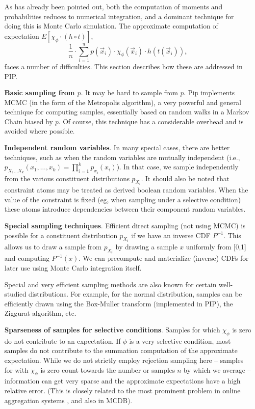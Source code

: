 

As has already been pointed out,
both the computation of moments and probabilities reduces to numerical
integration, and a dominant technique for doing this is Monte Carlo simulation.
The approximate computation of expectation
$E[\chi_\phi \cdot (h \circ t)]$,
\begin{equation}
\frac{1}{n} \cdot \sum_{i=1}^n p(\vec{x}_i) \cdot \chi_\phi(\vec{x}_i) \cdot
h(t(\vec{x}_i)),
\end{equation}
faces a number of difficulties.
This section describes how these are addressed in PIP.

{\bf Basic sampling from $p$}.
It may be hard to sample from $p$.
Pip implements MCMC (in the form of the Metropolis algorithm),
a very powerful and general technique for computing samples, essentially based
on random walks in a Markov Chain biased by $p$. Of course, this technique
has a considerable overhead and is avoided where possible.

{\bf Independent random variables}.
In many special cases, there are better techniques, such as
when the random variables are mutually independent (i.e.,
$p_{X_1 \dots X_k}(x_1, \dots, x_k) = \prod_{i=1}^k p_{x_i}(x_i)$).
In that case, we sample independently from the various constituent
distributions $p_{X_i}$.  It should also be noted that constraint atoms may 
be treated as derived boolean random variables.  When the value of the constraint is
fixed (eg, when sampling under a selective condition) these atoms introduce
dependencies between their component random variables.

{\bf Special sampling techniques}.
Efficient direct sampling (not using MCMC) is possible for a constituent
distribution $p_{X_i}$ if we have  an inverse CDF $P^{-1}$. This allows
us to draw a sample from $p_{X_i}$ by drawing a sample $x$ uniformly from [0,1]
and computing $P^{-1}(x)$.
We can precompute and materialize (inverse) CDFs for later use using Monte
Carlo integration itself.

Special and very efficient sampling methods are also known
for certain  well-studied distributions.
For example, for the normal distribution, samples can be efficiently drawn
using the Box-Muller transform (implemented in PIP), the Ziggurat algorithm, etc.

{\bf Sparseness of samples for selective conditions}.
Samples for which $\chi_{\phi}$ is zero do not contribute
to an expectation.
If $\phi$ is a very selective condition, most samples do not
contribute to the summation computation of the
approximate expectation.
While we do not strictly employ rejection sampling here --
samples for with $\chi_{\phi}$ is zero count towards the number or samples
$n$ by which we average -- information can get very sparse and the approximate
expectations have a high relative error.
(This is closely related to the most prominent problem in online
aggregation systems \cite{OnlineAggregation,DBO}, and also in MCDB).





